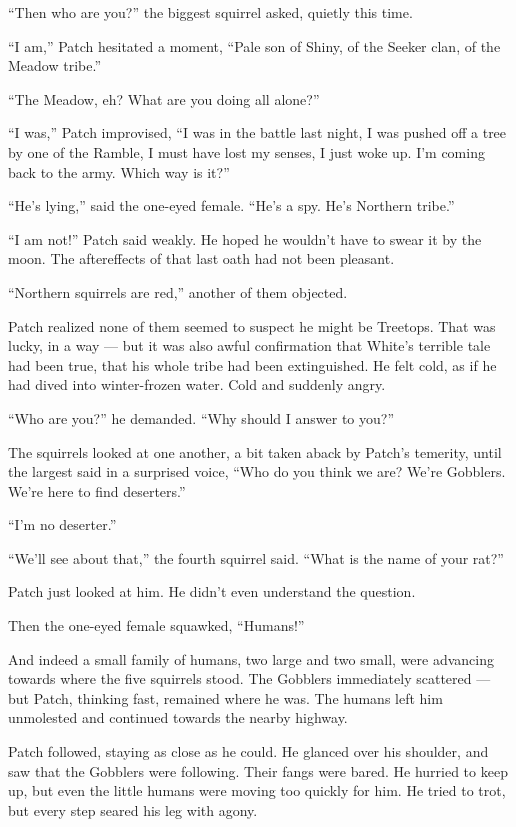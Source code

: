 \documentclass[ebook,oneside,openany,17pt]{memoir}
\begin{document}
“Then who are you?” the biggest squirrel asked, quietly this time.

“I am,” Patch hesitated a moment, “Pale son of Shiny, of the Seeker
clan, of the Meadow tribe.”

“The Meadow, eh? What are you doing all alone?”

“I was,” Patch improvised, “I was in the battle last night, I was
pushed off a tree by one of the Ramble, I must have lost my senses, I
just woke up. I’m coming back to the army. Which way is it?”

“He’s lying,” said the one-eyed female. “He’s a spy. He’s Northern
tribe.”

“I am not!” Patch said weakly. He hoped he wouldn’t have to swear it
by the moon. The aftereffects of that last oath had not been pleasant.

“Northern squirrels are red,” another of them objected.

Patch realized none of them seemed to suspect he might be
Treetops. That was lucky, in a way — but it was also awful
confirmation that White’s terrible tale had been true, that his whole
tribe had been extinguished. He felt cold, as if he had dived into
winter-frozen water. Cold and suddenly angry.

“Who are you?” he demanded. “Why should I answer to you?”

The squirrels looked at one another, a bit taken aback by Patch’s
temerity, until the largest said in a surprised voice, “Who do you
think we are? We’re Gobblers. We’re here to find deserters.”

“I’m no deserter.”

“We’ll see about that,” the fourth squirrel said. “What is the name of
your rat?”

Patch just looked at him. He didn’t even understand the question.

Then the one-eyed female squawked, “Humans!”

And indeed a small family of humans, two large and two small, were
advancing towards where the five squirrels stood. The Gobblers
immediately scattered — but Patch, thinking fast, remained where he
was. The humans left him unmolested and continued towards the nearby
highway.

Patch followed, staying as close as he could. He glanced over his
shoulder, and saw that the Gobblers were following. Their fangs were
bared. He hurried to keep up, but even the little humans were moving
too quickly for him. He tried to trot, but every step seared his leg
with agony.
\end{document}
